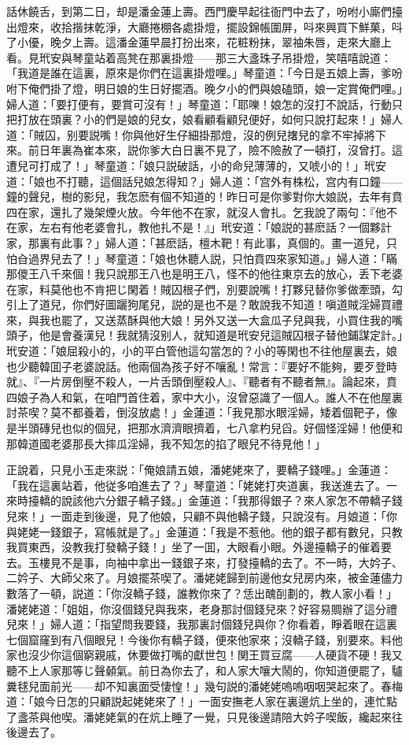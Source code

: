 話休饒舌，到第二日，却是潘金蓮上壽。西門慶早起往衙門中去了，吩咐小廝們擡出燈來，收拾揩抹乾淨，大廳捲棚各處掛燈，擺設錦帳圍屏，呌來興買下鮮菓，呌了小優，晚夕上壽。這潘金蓮早晨打扮出來，花粧粉抹，翠袖朱唇，走來大廳上看。見玳安與琴童站着高凳在那裏掛燈——那三大盞珠子吊掛燈，笑嘻嘻說道：「我道是誰在這裏，原來是你們在這裏掛燈哩。」琴童道：「今日是五娘上壽，爹吩咐下俺們掛了燈，明日娘的生日好擺酒。晚夕小的們與娘磕頭，娘一定賞俺們哩。」婦人道：「要打便有，要賞可沒有！」琴童道：「耶嚛！娘怎的沒打不說話，行動只把打放在頭裏？小的們是娘的兒女，娘看顧看顧兒便好，如何只說打起來！」婦人道：「賊囚，别要説嘴！你與他好生仔細掛那燈，沒的例兒撦兒的拿不牢掉將下來。前日年裏為崔本來，説你爹大白日裏不見了，險不險赦了一頓打，沒曾打。這遭兒可打成了！」琴童道：「娘只説破話，小的命兒薄薄的，又唬小的！」玳安道：「娘也不打聽，這個話兒娘怎得知？」婦人道：「宫外有株松，宫内有口鐘——鐘的聲兒，樹的影兒，我怎麽有個不知道的！昨日可是你爹對你大娘説，去年有賁四在家，還扎了幾架煙火放。今年他不在家，就沒人會扎。乞我說了兩句：『他不在家，左右有他老婆會扎，教他扎不是！』」玳安道：「娘説的甚麽話？一個夥計家，那裏有此事？」婦人道：「甚麽話，檀木靶！有此事，真個的。畫一道兒，只怕㒲過界兒去了！」琴童道：「娘也休聽人説，只怕賁四來家知道。」婦人道：「瞞那儍王八千來個！我只說那王八也是明王八，怪不的他往東京去的放心，丢下老婆在家，料莫他也不肯把じ閑着！賊囚根子們，別要說嘴！打夥兒替你爹做牽頭，勾引上了道兒，你們好圖躧狗尾兒，説的是也不是？敢說我不知道！嗔道賊淫婦買禮來，與我也罷了，又送蒸酥與他大娘！另外又送一大盒瓜子兒與我，小買住我的嘴頭子，他是會養漢兒！我就猜沒别人，就知道是玳安兒這賊囚根子替他鋪謀定計。」玳安道：「娘屈殺小的，小的平白管他這勾當怎的？小的等閑也不往他屋裏去，娘也少聽韓囬子老婆說話。他兩個為孩子好不嚷亂！常言：『要好不能夠，要歹登時就』、『一片房倒壓不殺人，一片舌頭倒壓殺人』、『聽者有不聽者無』。論起來，賁四娘子為人和氣，在咱門首住着，家中大小，沒曾惡識了一個人。誰人不在他屋裏討茶喫？莫不都養着，倒沒放處！」金蓮道：「我見那水眼淫婦，矮着個靶子，像是半頭磚兒也似的個兒，把那水濟濟眼擠着，七八拿杓兒舀。好個怪淫婦！他便和那韓道國老婆那長大摔瓜淫婦，我不知怎的掐了眼兒不待見他！」

正說着，只見小玉走來説：「俺娘請五娘，潘姥姥來了，要轎子錢哩。」金蓮道：「我在這裏站着，他従多咱進去了？」琴童道：「姥姥打夾道裏，我送進去了。一來時擡轎的說該他六分銀子轎子錢。」金蓮道：「我那得銀子？來人家怎不帶轎子錢兒來！」一面走到後邊，見了他娘，只顧不與他轎子錢，只說沒有。月娘道：「你與姥姥一錢銀子，寫帳就是了。」金蓮道：「我是不惹他。他的銀子都有數兒，只教我買東西，没教我打發轎子錢！」坐了一囬，大眼看小眼。外邊擡轎子的催着要去。玉樓見不是事，向袖中拿出一錢銀子來，打發擡轎的去了。不一時，大妗子、二妗子、大師父來了。月娘擺茶喫了。潘姥姥歸到前邊他女兒房内來，被金蓮儘力數落了一頓，説道：「你沒轎子錢，誰教你來了？恁出醜㓦劃的，教人家小看！」潘姥姥道：「姐姐，你沒個錢兒與我來，老身那討個錢兒來？好容易賙辦了這分禮兒來！」婦人道：「指望問我要錢，我那裏討個錢兒與你？你看着，睜着眼在這裏七個窟窿到有八個眼兒！今後你有轎子錢，便來他家來；沒轎子錢，别要來。料他家也沒少你這個窮親戚，休要做打嘴的獻世包！関王買豆腐——人硬貨不硬！我又聽不上人家那等じ聲顙氣。前日為你去了，和人家大嚷大鬧的，你知道便罷了，驢糞毬兒面前光——却不知裏面受悽惶！」幾句説的潘姥姥嗚嗚咽咽哭起來了。春梅道：「娘今日怎的只顧説起姥姥來了！」一面安撫老人家在裏邊炕上坐的，連忙點了盞茶與他喫。潘姥姥氣的在炕上睡了一覺，只見後邊請陪大妗子喫飯，纔起來往後邊去了。


